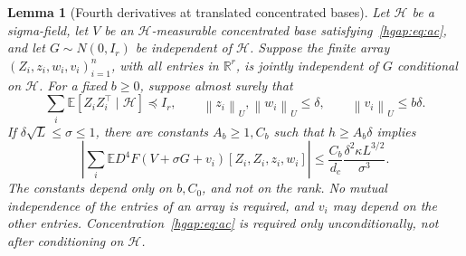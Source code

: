 \documentclass[11pt,letterpaper,twoside,leqno]{article}
\theoremstyle{bookplain}
\newtheorem{lemma}{Lemma}
\theoremstyle{bookremark}
\newcommand{\E}{\mathbb E}
\newcommand{\R}{\mathbb R}
\newcommand{\norm}[1]{\left\lVert#1\right\rVert}
\begin{document}
\begin{lemma}[Fourth derivatives at translated concentrated bases]
\label{hgap:thm:fourth}
Let $\mathcal H$ be a sigma-field, let $V$ be an $\mathcal H$-measurable
concentrated base satisfying~\eqref{hgap:eq:ac}, and let
$G\sim N(0,I_r)$ be independent of $\mathcal H$.
Suppose the finite array $(Z_i,z_i,w_i,v_i)_{i=1}^n$, with all entries
in $\R^r$, is jointly independent of $G$ conditional on $\mathcal H$.
For a fixed $b\ge0$, suppose almost surely that
\[
 \sum_i\E[Z_iZ_i^\top\mid\mathcal H]\preceq I_r,\qquad
 \norm{z_i}_U,\norm{w_i}_U\le\delta,\qquad
 \norm{v_i}_U\le b\delta.
\]
If $\delta\sqrt L\le\sigma\le1$, there are constants $A_b\ge1,C_b$
such that $h\ge A_b\delta$ implies
\begin{equation}
 \left|\sum_i\E D^4F(V+\sigma G+v_i)[Z_i,Z_i,z_i,w_i]\right|
 \le \frac{C_b}{d_c}\frac{\delta^2\kappa L^{3/2}}{\sigma^3}.
 \label{hgap:eq:fourth-bound}
\end{equation}
The constants depend only on $b,C_0$, and not on the rank. No mutual independence of the
entries of an array is required, and $v_i$ may depend on the other
entries. Concentration~\eqref{hgap:eq:ac} is required only unconditionally,
not after conditioning on $\mathcal H$.
\end{lemma}
\end{document}
